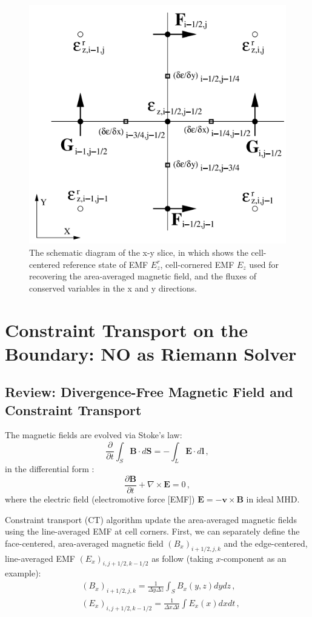 \documentclass[%
 reprint,
 superscriptaddress,
 amsmath,amssymb,
 nofootinbib,
 prd,
]{revtex4-2}
\newcommand{\hywcom}[1]{{\color{purple}{[HYW: #1]}}}
\begin{document}
\begin{figure}
    \centering
    \includegraphics[width=0.4\linewidth]{figures/ct-2.png}
    \caption{
    \hywcom{Adopting from Athena method paper-remake later}
    The schematic diagram of the x-y slice, in which shows the cell-centered reference state of EMF $E^r_z$, cell-cornered EMF $E_z$ used for recovering the area-averaged magnetic field, and the fluxes of conserved variables in the x and y directions.
    } 
    \label{fig:ct-2}
\end{figure}

\section{Constraint Transport on the Boundary: NO as Riemann Solver }

\subsection{Review: Divergence-Free Magnetic Field and Constraint Transport}
The magnetic fields are evolved via Stoke's law:
\begin{equation}
\frac{\partial}{\partial t} \int_S \boldsymbol{B} \cdot d \boldsymbol{S}=-\int_L \boldsymbol{E} \cdot d \boldsymbol{l} \,,
\end{equation}
in the differential form : 
\begin{equation}
\frac{\partial \boldsymbol{B}}{\partial t}+\nabla \times \boldsymbol{E} =0 \,,
\end{equation}
where the electric field (electromotive force [EMF]) $\boldsymbol{E}=-\boldsymbol{v}\times \boldsymbol{B}$ in ideal MHD. 


Constraint transport (CT) algorithm update the area-averaged magnetic fields using the line-averaged EMF at cell corners. First, we can separately define the face-centered, area-averaged magnetic field $\left(B_x\right)_{i+1 / 2, j, k}$ and the edge-centered, line-averaged EMF $\left(E_x\right)_{i, j+1 / 2, k-1 / 2}$ as follow (taking $x$-component as an example): 
\begin{align}
&\left(B_x\right)_{i+1 / 2, j, k} =\frac{1}{\Delta y \Delta z} \int_S B_x(y, z) d y d z\, , \\
&\left(E_x\right)_{i, j+1 / 2, k-1 / 2} =\frac{1}{\Delta x \Delta t} \int E_x(x) d x d t\, ,
\end{align}
\end{document}
